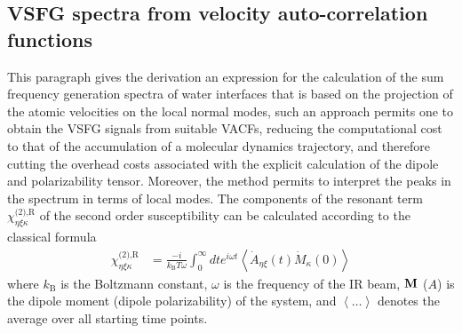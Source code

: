 \subsection{VSFG spectra from velocity auto-correlation functions}
This paragraph gives the derivation an expression for the calculation of the sum frequency generation spectra of water interfaces that is
based on the projection of the atomic velocities on the local normal modes, such an approach permits one to obtain the VSFG signals from suitable
VACFs, reducing the computational cost to that of the accumulation of a molecular dynamics trajectory, and therefore cutting 
the overhead costs associated with the explicit calculation of the dipole and polarizability tensor. Moreover, the method permits to interpret 
the peaks in the spectrum in terms of local modes.
The components of the resonant term $\chi^{\text{(2),R}}_{\eta\xi\kappa}$ of the second order susceptibility can be calculated 
according to the classical formula \cite{Morita02,Morita2008,Nihonyanagi2011}
\begin{align}
  \chi^{\text{(2),R}}_{\eta\xi\kappa}&=\frac{-i}{k_{\text{B}}T \omega} \int_0^\infty dt e^{i\omega t}\left\langle \dot{A}_{\eta\xi}(t) \dot{M}_{\kappa}(0)\right\rangle 
 \label{eq:chi}
\end{align}
where $k_{\text{B}}$ is the Boltzmann constant, $\omega$ is the frequency of the IR beam, ${\bf M}$ (${A}$) is the dipole 
moment (dipole polarizability) of the system, and $\left\langle\dots\right\rangle$ denotes the average over all starting time points. 
 
